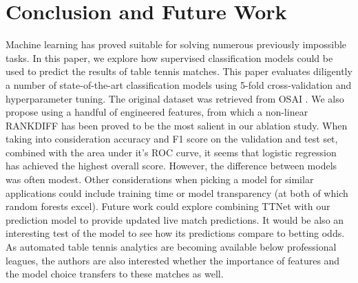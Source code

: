 \section{Conclusion and Future Work} \label{sec:conc}
Machine learning has proved suitable for solving numerous previously impossible tasks. In this paper, we explore how supervised classification models could be used to predict the results of table tennis matches. 
This paper evaluates diligently a number of state-of-the-art classification models using 5-fold cross-validation and hyperparameter tuning. The original dataset was retrieved from OSAI \cite{OSAI}. We also propose using a handful of engineered features, from which a non-linear RANKDIFF has been proved to be the most salient in our ablation study.
When taking into consideration accuracy and F1 score on the validation and test set, combined with the area under it's ROC curve, it seems that logistic regression has achieved the highest overall score. However, the difference between models was often modest. Other considerations when picking a model for similar applications could include training time or model transparency (at both of which random forests excel).
Future work could explore combining TTNet with our prediction model to provide updated live match predictions. It would be also an interesting test of the model to see how its predictions compare to betting odds. As automated table tennis analytics are becoming available below professional leagues, the authors are also interested whether the importance of features and the model choice transfers to these matches as well.


